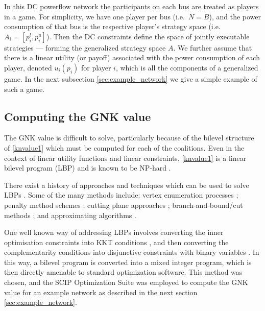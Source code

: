 In this DC powerflow network the participants on each bus are treated as players in a game.
For simplicity, we have one player per bus (i.e.~$N=B$), and the power consumption of that bus is the respective player's strategy space (i.e.\ $A_i=[p_i^l,p_i^u]$).
Then the DC constraints define the space of jointly executable strategies --- forming the generalized strategy space $A$. 
We further assume that there is a linear utility (or payoff) associated with the power consumption of each player, denoted $u_i(p_i)$ for player $i$,
which is all the components of a generalized game.
In the next subsection \ref{sec:example_network} we give a simple example of such a game.



\subsection{Computing the GNK value}
The GNK value is difficult to solve, particularly because of the bilevel structure of \eqref{knvalue1} which must be computed for each of the coalitions.
Even in the context of linear utility functions and linear constraints, \eqref{knvalue1} is a linear bilevel program (LBP) and is known to be  NP-hard \cite{DBLP:journals/tec/SinhaMD18,Ben-Ayed:1990:CDB}.

There exist a history of approaches and techniques which can be used to solve LBPs \cite{DBLP:journals/tec/SinhaMD18,S.Dempe.Optimisations}.
Some of the many methods include: vertex enumeration processes \cite{Bialas:1984:TLP:2784019.2784026,Shi:2005:EKA:2641854.2642183,LIU1995644,article_cutting_plane}; penalty method schemes \cite{KleinertSchmidt2019,ONAL1993126,dempe_optimisation111};
cutting plane approaches \cite{cuttingplane1};
branch-and-bound/cut methods \cite{SHI200551,Hansen:1992:NBR:141164.141181,Audet2007};
and approximating algorithms \cite{Pineda2018,rnnlbp1,genetic_algirthm_blp}.

One well known way of addressing LBPs involves converting the inner optimisation constraints into KKT conditions \cite{kuhn1951nonlinear}, and then converting the complementarity conditions into disjunctive constraints with binary variables \cite{Fortuny-Amat1981,Pineda2018}.
In this way, a bilevel program is converted into a mixed integer program, which is then directly amenable to standard optimization software.
This method was chosen, and the SCIP Optimization Suite \cite{MaherFischerGallyetal.2017} was employed to compute the GNK value for an example network as described in the next section \ref{sec:example_network}.

